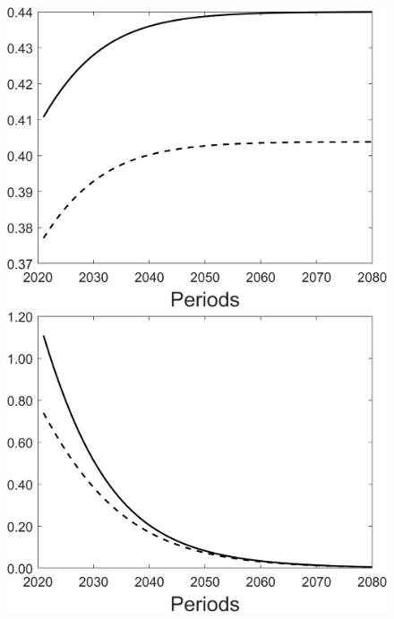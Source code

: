 \begin{figure}[h!!]
\begin{minipage}[]{0.32\textwidth}
	\end{minipage}
	\begin{minipage}[]{0.32\textwidth}
		\includegraphics[width=1\textwidth]{../../codding_model/Own/figures/Rep_agent/staticRam_LF_separate_hl_periods59_eppsilon4.00_zeta1.40_Ad08_Ac04_thetac0.70_thetad0.56_HetGrowth1_tauul0.181_util0_withtarget0_lgd0.png}
	\end{minipage}
\begin{minipage}[]{0.32\textwidth}
\includegraphics[width=1\textwidth]{../../codding_model/Own/figures/Rep_agent/staticRam_LF_separate_yc_periods59_eppsilon4.00_zeta1.40_Ad08_Ac04_thetac0.70_thetad0.56_HetGrowth1_tauul0.181_util0_withtarget0_lgd0.png}

\end{minipage}
\end{figure}
